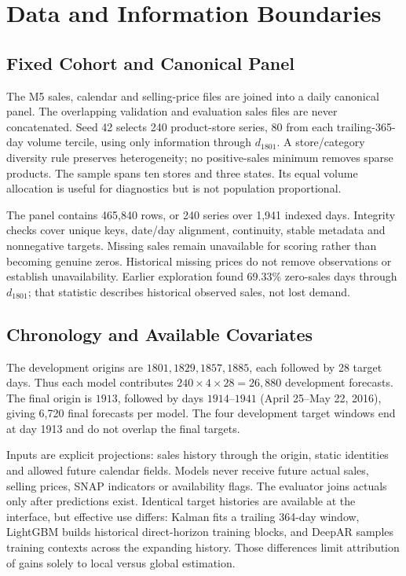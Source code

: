 \documentclass[conference]{IEEEtran}
\begin{document}
\section{Data and Information Boundaries}
\subsection{Fixed Cohort and Canonical Panel}
The M5 sales, calendar and selling-price files are joined into a daily canonical panel. The overlapping validation and evaluation sales files are never concatenated. Seed 42 selects 240 product-store series, 80 from each trailing-365-day volume tercile, using only information through $d_{1801}$. A store/category diversity rule preserves heterogeneity; no positive-sales minimum removes sparse products. The sample spans ten stores and three states. Its equal volume allocation is useful for diagnostics but is not population proportional.

The panel contains 465,840 rows, or 240 series over 1,941 indexed days. Integrity checks cover unique keys, date/day alignment, continuity, stable metadata and nonnegative targets. Missing sales remain unavailable for scoring rather than becoming genuine zeros. Historical missing prices do not remove observations or establish unavailability. Earlier exploration found 69.33\% zero-sales days through $d_{1801}$; that statistic describes historical observed sales, not lost demand.

\subsection{Chronology and Available Covariates}
The development origins are $1801,1829,1857,1885$, each followed by 28 target days. Thus each model contributes $240\times4\times28=26,880$ development forecasts. The final origin is $1913$, followed by days $1914$--$1941$ (April 25--May 22, 2016), giving 6,720 final forecasts per model. The four development target windows end at day 1913 and do not overlap the final targets.

Inputs are explicit projections: sales history through the origin, static identities and allowed future calendar fields. Models never receive future actual sales, selling prices, SNAP indicators or availability flags. The evaluator joins actuals only after predictions exist. Identical target histories are available at the interface, but effective use differs: Kalman fits a trailing 364-day window, LightGBM builds historical direct-horizon training blocks, and DeepAR samples training contexts across the expanding history. Those differences limit attribution of gains solely to local versus global estimation.
\end{document}
